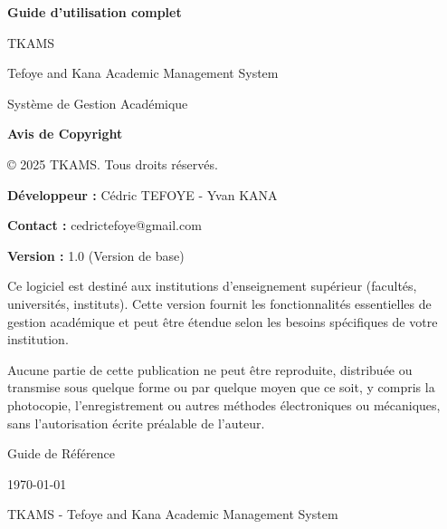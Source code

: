 \documentclass[12pt,a4paper]{article}
\begin{document}
\begin{titlepage}
    \centering
    \vspace*{2cm}

    {\Huge\bfseries Guide d'utilisation complet\par}
    \vspace{1cm}
    {\LARGE TKAMS\par}
    {\LARGE Tefoye and Kana Academic Management System\par}
    \vspace{0.5cm}
    {\large Système de Gestion Académique\par}
    \vspace{1.5cm}

    \begin{figure}[H]
        \centering
    \end{figure}

    \vspace{2cm}
\noindent\textbf{Avis de Copyright}

\noindent © 2025 TKAMS. Tous droits réservés.

\noindent \textbf{Développeur :} Cédric TEFOYE - Yvan KANA

\noindent \textbf{Contact :} cedrictefoye@gmail.com

\noindent \textbf{Version :} 1.0 (Version de base)

\noindent Ce logiciel est destiné aux institutions d'enseignement supérieur (facultés, universités, instituts). Cette version fournit les fonctionnalités essentielles de gestion académique et peut être étendue selon les besoins spécifiques de votre institution.

\noindent Aucune partie de cette publication ne peut être reproduite, distribuée ou transmise sous quelque forme ou par quelque moyen que ce soit, y compris la photocopie, l'enregistrement ou autres méthodes électroniques ou mécaniques, sans l'autorisation écrite préalable de l'auteur.

    \vspace{0.5cm}
    {\large Guide de Référence\par}
    \vspace{1cm}
    {\large \today\par}

    \vfill
    {\large TKAMS - Tefoye and Kana Academic Management System\par}
\end{titlepage}

\tableofcontents
\newpage













\end{document}
